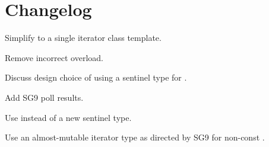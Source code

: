 \section{Changelog}
\begin{revision}
\item Simplify to a single iterator class template.
\item Remove incorrect  overload.
\item Discuss design choice of using a sentinel type for .
\end{revision}

\begin{revision}
\item Add SG9 poll results.
\item Use  instead of a new sentinel type.
\item Use an almost-mutable iterator type as directed by SG9 for
  non-const .
\end{revision}
